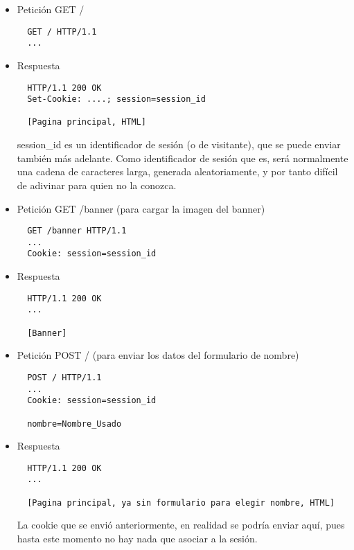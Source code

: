 \begin{itemize}
\item Petición GET /

\begin{verbatim}
  GET / HTTP/1.1
  ...
\end{verbatim}

\item Respuesta

\begin{verbatim}
  HTTP/1.1 200 OK
  Set-Cookie: ....; session=session_id

  [Pagina principal, HTML]
\end{verbatim}

session\_id es un identificador de sesión (o de visitante), que se puede enviar también más adelante. Como identificador de sesión que es, será normalmente una cadena de caracteres larga, generada aleatoriamente, y por tanto difícil de adivinar para quien no la conozca.

\item Petición GET /banner (para cargar la imagen del banner)

\begin{verbatim}
  GET /banner HTTP/1.1
  ...
  Cookie: session=session_id
\end{verbatim}

\item Respuesta

\begin{verbatim}
  HTTP/1.1 200 OK
  ...

  [Banner]
\end{verbatim}

\item Petición POST / (para enviar los datos del formulario de nombre)

\begin{verbatim}
  POST / HTTP/1.1
  ...
  Cookie: session=session_id

  nombre=Nombre_Usado
\end{verbatim}

\item Respuesta

\begin{verbatim}
  HTTP/1.1 200 OK
  ...

  [Pagina principal, ya sin formulario para elegir nombre, HTML]
\end{verbatim}

La cookie que se envió anteriormente, en realidad se podría enviar aquí, pues hasta este momento no hay nada que asociar a la sesión.


\end{itemize}
